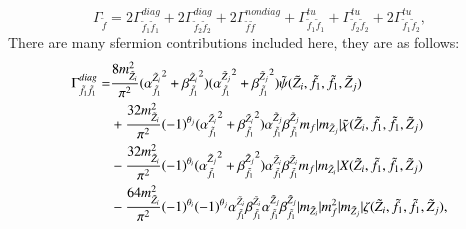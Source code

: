 \documentclass[final,3p,times,pdflatex]{elsarticle}
\begin{document}
\begin{equation}
\Gamma_{\tilde{f}} = 2\Gamma_{\tilde{f}_1 \tilde{f}_1}^{diag} + 2\Gamma_{\tilde{f}_2 \tilde{f}_2}^{diag} + 2\Gamma_{\tilde{f}\tilde{f}}^{nondiag} + \Gamma_{\tilde{f}_1 \tilde{f}_1}^{tu} + \Gamma_{\tilde{f}_2 \tilde{f}_2}^{tu} + 2\Gamma_{\tilde{f}_1 \tilde{f}_2}^{tu},
\end{equation}
There are many sfermion contributions included here, they are as follows:
\begin{equation}
\begin{aligned}
\Gamma_{\tilde{f}_1 \tilde{f}_1}^{diag} = & {8m_{\tilde{Z}_i}^2 \over \pi^2}({\alpha_{\tilde{f}_1}^{\tilde{Z}_i}}^2 + {\beta_{\tilde{f}_1}^{\tilde{Z}_i}}^2) ({\alpha_{\tilde{f}_1}^{\tilde{Z}_j}}^2 + {\beta_{\tilde{f}_1}^{\tilde{Z}_j}}^2)  \tilde{\psi}(\tilde{Z}_i,\tilde{f}_1,\tilde{f}_1,\tilde{Z}_j) \\ & + {32 m_{\tilde{Z}_i}^2 \over \pi^2}(-1)^{\theta_j} ({\alpha_{\tilde{f}_1}^{\tilde{Z}_i}}^2 + {\beta_{\tilde{f}_1}^{\tilde{Z}_i}}^2) {\alpha_{\tilde{f}_1}^{\tilde{Z}_j}} {\beta_{\tilde{f}_1}^{\tilde{Z}_j}} m_{f} |m_{\tilde{Z}_j}|\tilde{\chi}(\tilde{Z}_i,\tilde{f}_1, \tilde{f}_1, \tilde{Z}_j) \\ & - {32 m_{\tilde{Z}_i}^2 \over \pi^2} (-1)^{\theta_i} ({\alpha_{\tilde{f}_1}^{\tilde{Z}_j}}^2 + {\beta_{\tilde{f}_1}^{\tilde{Z}_j}}^2) {\alpha_{\tilde{f}_1}^{\tilde{Z}_i}} {\beta_{\tilde{f}_1}^{\tilde{Z}_i}} m_f |m_{\tilde{Z}_i}|X(\tilde{Z}_i, \tilde{f}_1, \tilde{f}_1, \tilde{Z}_j) \\ & - {64 m_{\tilde{Z}_i}^2 \over \pi^2}(-1)^{\theta_i}(-1)^{\theta_j} {\alpha_{\tilde{f}_1}^{\tilde{Z}_i}} {\beta_{\tilde{f}_1}^{\tilde{Z}_i}} {\alpha_{\tilde{f}_1}^{\tilde{Z}_j}} {\beta_{\tilde{f}_1}^{\tilde{Z}_j}} |m_{\tilde{Z}_i}|m_{f}^2 |m_{\tilde{Z}_j}| \zeta(\tilde{Z}_{i},\tilde{f}_{1}, \tilde{f}_1, \tilde{Z}_j),
\end{aligned}
\end{equation}
\end{document}
